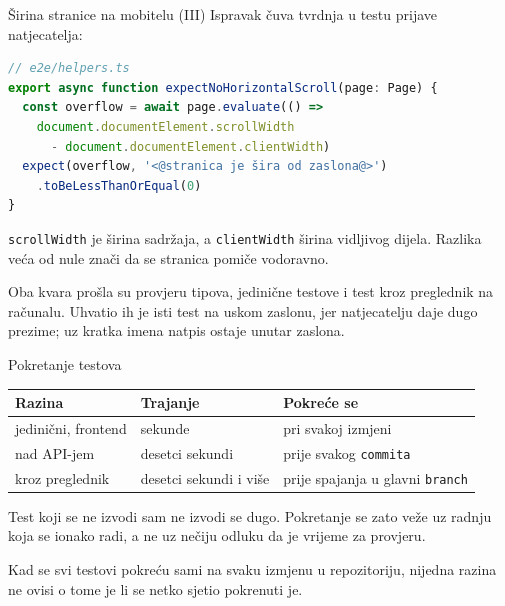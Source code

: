 \begin{frame}[fragile]{Širina stranice na mobitelu (III)}
Ispravak čuva tvrdnja u testu prijave natjecatelja:

\begin{lstlisting}[language=typescript]
// e2e/helpers.ts
export async function expectNoHorizontalScroll(page: Page) {
  const overflow = await page.evaluate(() =>
    document.documentElement.scrollWidth
      - document.documentElement.clientWidth)
  expect(overflow, '<@stranica je šira od zaslona@>')
    .toBeLessThanOrEqual(0)
}
\end{lstlisting}

\vspace{0.4em}
\texttt{scrollWidth} je širina sadržaja, a \texttt{clientWidth} širina vidljivog dijela. Razlika veća od nule znači da se stranica pomiče vodoravno.

\vspace{0.4em}
Oba kvara prošla su provjeru tipova, jedinične testove i test kroz preglednik na računalu. Uhvatio ih je isti test na uskom zaslonu, jer natjecatelju daje dugo prezime; uz kratka imena natpis ostaje unutar zaslona.
\end{frame}

\begin{frame}{Pokretanje testova}
\vspace{0.3em}
\begin{center}
{\small
\setlength{\tabcolsep}{6pt}
\renewcommand{\arraystretch}{1.3}
\begin{tabular}{@{}L{3.3cm}L{3.5cm}L{4.8cm}@{}}
  \toprule
  \textbf{Razina} & \textbf{Trajanje} & \textbf{Pokreće se} \\
  \midrule
  jedinični, frontend & sekunde & pri svakoj izmjeni \\
  nad API-jem & desetci sekundi & prije svakog \texttt{commita} \\
  kroz preglednik & desetci sekundi i više & prije spajanja u glavni \texttt{branch} \\
  \bottomrule
\end{tabular}
}
\end{center}

\vspace{0.6em}
Test koji se ne izvodi sam ne izvodi se dugo. Pokretanje se zato veže uz radnju koja se ionako radi, a ne uz nečiju odluku da je vrijeme za provjeru.

\vspace{0.6em}
Kad se svi testovi pokreću sami na svaku izmjenu u repozitoriju, nijedna razina ne ovisi o tome je li se netko sjetio pokrenuti je.
\end{frame}

